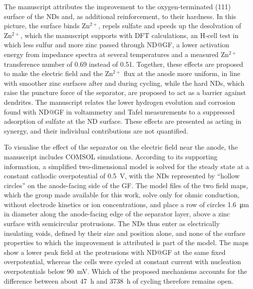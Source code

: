 The manuscript attributes the improvement to the oxygen-terminated (111) surface of the NDs and, as additional reinforcement, to their hardness\cite{zhang_crystal_2026}.
In this picture, the surface binds Zn$^{2+}$, repels sulfate and speeds up the desolvation of Zn$^{2+}$, which the manuscript supports with DFT calculations, an H-cell test in which less sulfur and more zinc passed through ND@GF, a lower activation energy from impedance spectra at several temperatures and a measured Zn$^{2+}$ transference number of 0.69 instead of 0.51\cite{zhang_crystal_2026}.
Together, these effects are proposed to make the electric field and the Zn$^{2+}$ flux at the anode more uniform, in line with smoother zinc surfaces after and during cycling, while the hard NDs, which raise the puncture force of the separator, are proposed to act as a barrier against dendrites\cite{zhang_crystal_2026}.
The manuscript relates the lower hydrogen evolution and corrosion found with ND@GF in voltammetry and Tafel measurements to a suppressed adsorption of sulfate at the ND surface\cite{zhang_crystal_2026}.
These effects are presented as acting in synergy, and their individual contributions are not quantified\cite{zhang_crystal_2026}.

To visualise the effect of the separator on the electric field near the anode, the manuscript includes COMSOL simulations\cite{zhang_crystal_2026}.
According to its supporting information, a simplified two-dimensional model is solved for the steady state at a constant cathodic overpotential of \SI{0.5}{V}, with the NDs represented by ``hollow circles'' on the anode-facing side of the GF\cite{zhang_crystal_2026}.
The model files of the two field maps, which the group made available for this work, solve only for ohmic conduction, without electrode kinetics or ion concentrations, and place a row of circles \SI{1.6}{\um} in diameter along the anode-facing edge of the separator layer, above a zinc surface with semicircular protrusions.
The NDs thus enter as electrically insulating voids, defined by their size and position alone, and none of the surface properties to which the improvement is attributed is part of the model.
The maps show a lower peak field at the protrusions with ND@GF at the same fixed overpotential, whereas the cells were cycled at constant current with nucleation overpotentials below \SI{90}{mV}\cite{zhang_crystal_2026}.
Which of the proposed mechanisms accounts for the difference between about \SI{47}{h} and \SI{3738}{h} of cycling therefore remains open.

